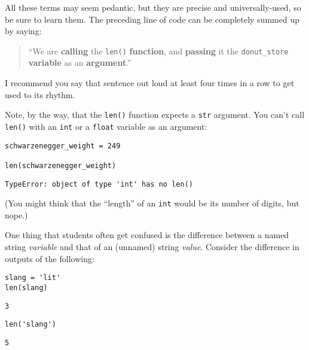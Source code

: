 All these terms may seem pedantic, but they are precise and universally-used,
so be sure to learn them. The preceding line of code can be completely summed
up by saying:

\begin{quote}
``We are \textbf{calling} the \texttt{len()} \textbf{function},
and \textbf{passing} it the \texttt{donut\_store} \textbf{variable} as an
\textbf{argument}.''
\end{quote}

I recommend you say that sentence out loud at least four times in a row to get
used to its rhythm.

Note, by the way, that the \texttt{len()} function expects a \texttt{str}
argument. You can't call \texttt{len()} with an \texttt{int} or a
\texttt{float} variable as an argument:

\begin{Verbatim}[fontsize=\small,samepage=true,frame=single,framesep=3mm]
schwarzenegger_weight = 249

len(schwarzenegger_weight)
\end{Verbatim}

\begin{Verbatim}[fontsize=\small,samepage=true,frame=leftline,framesep=5mm,framerule=1mm]
TypeError: object of type 'int' has no len()
\end{Verbatim}

(You might think that the ``length'' of an \texttt{int} would be its number of
digits, but nope.)

One thing that students often get confused is the difference between a named
string \textit{variable} and that of an (unnamed) string \textit{value}.
Consider the difference in outputs of the following:

\begin{Verbatim}[fontsize=\small,samepage=true,frame=single,framesep=3mm]
slang = 'lit'
len(slang)
\end{Verbatim}
\begin{Verbatim}[fontsize=\small,samepage=true,frame=leftline,framesep=5mm,framerule=1mm]
3
\end{Verbatim}
\begin{Verbatim}[fontsize=\small,samepage=true,frame=single,framesep=3mm]
len('slang')
\end{Verbatim}
\begin{Verbatim}[fontsize=\small,samepage=true,frame=leftline,framesep=5mm,framerule=1mm]
5
\end{Verbatim}

